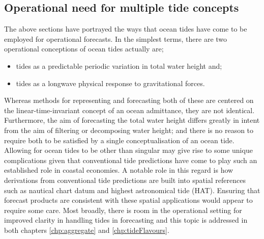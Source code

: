 \subsection{Operational need for multiple tide concepts}
The above sections have portrayed the ways that ocean tides have come to be employed for operational forecasts.
In the simplest terms, there are two operational conceptions of ocean tides actually are;
\begin{itemize}
    \item tides as a predictable periodic variation in total water height and;
    \item tides as a longwave physical response to gravitational forces.
\end{itemize}
Whereas methods for representing and forecasting both of these are centered on the linear-time-invariant concept of an ocean admittance, they are not identical.
Furthermore, the aim of forecasting the total water height differs greatly in intent from the aim of filtering or decomposing water height; and there is no reason to require both to be satisfied by a single conceptualisation of an ocean tide. 
Allowing for ocean tides to be other than singular may give rise to some unique complications given that conventional tide predictions have come to play such an established role in coastal economies.   A notable role in this regard is how derivations from conventional tide predictions are built into spatial references such as nautical chart datum and highest astronomical tide (HAT).   Ensuring that forecast products are consistent with these spatial applications would appear to require some care.  
Most broadly, there is room in the operational setting for improved clarity in handling tides in forecasting and this topic is addressed in both chapters 
\ref{chp:aggregate} and \ref{chp:tideFlavours}. 
